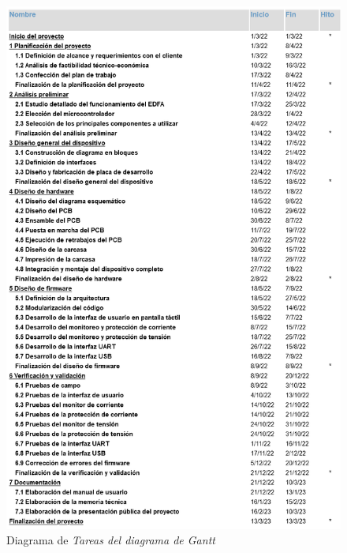\documentclass[
11pt, %
codirector, %
]{charter}
\begin{document}
\begin{figure}[H]
\centering 
\includegraphics[width=.85\textwidth]{./Figuras/Gantt_Tareas.png}
\caption{Diagrama de \textit{Tareas del diagrama de Gantt}}
\label{fig:Gantt_Tareas}
\end{figure}
\end{document}

